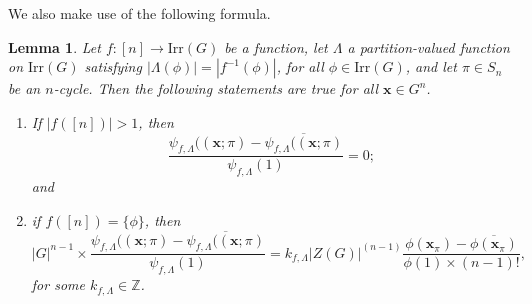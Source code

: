 \documentclass{amsart}
\theoremstyle{plain}
\newtheorem{lemma}[theorem]{Lemma}
\theoremstyle{remark}\newtheorem{con}[theorem]{Construction}
\theoremstyle{remark} \newtheorem*{remark}{Remark}
\theoremstyle{remark} \newtheorem{example}{Example}
\newcommand{\bb}{\mathbb}
\newcommand{\mbf}{\mathbf}
\newcommand{\ov}{\overline}
\newcommand{\irr}{\mathrm{Irr}}
\begin{document}
We also make use of the following formula.
\begin{lemma}\label{lem:centralcharacterc2}
Let $f:[n]\to \irr(G)$ be a function, let  $\Lambda$ a partition-valued function on $\irr(G)$ satisfying $|\Lambda(\phi)|=|f^{-1}(\phi)|$, for all $\phi \in \irr(G)$, and let $\pi \in S_{n}$ be an $n$-cycle.
Then the following statements are true for all $\mbf{x}\in G^{n}$.
\begin{enumerate}
    \item If $|f([n])|>1$, then 
    \[\dfrac{\psi_{f,\Lambda}((\mbf{x}; \pi)-\ov{\psi_{f,\Lambda}((\mbf{x}; \pi)}}{\psi_{f,\Lambda}(1)}=0;\] and
    \item if $f([n])=\{\phi\}$, then 
    \[
    |G|^{n-1} \times\dfrac{\psi_{f,\Lambda}((\mbf{x}; \pi)-\ov{\psi_{f,\Lambda}((\mbf{x}; \pi)}}{\psi_{f,\Lambda}(1)} = k_{f,\Lambda}|Z(G)|^{(n-1)} \dfrac{\phi\left( \mbf{x}_{\pi}  \right)-\ov{\phi\left( \mbf{x}_{\pi}  \right)}}{\phi(1) \times (n-1)!},
    \]
    for some $k_{f,\Lambda} \in \bb{Z}$. 
\end{enumerate}
\end{lemma}
\end{document}
